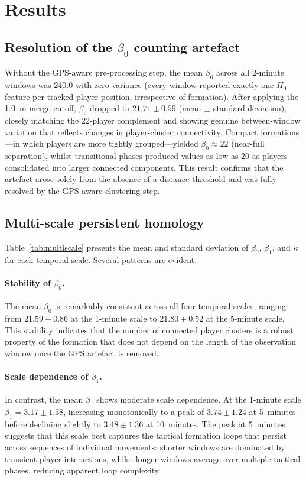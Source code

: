\documentclass[11pt,a4paper]{article}
\begin{document}
\section{Results}
\label{sec:results}

\subsection{Resolution of the \(\beta_0\) counting artefact}
\label{sec:artefact_results}

Without the GPS-aware pre-processing step, the mean
\(\beta_0\) across all 2-minute windows was 240.0 with
zero variance (every window reported exactly one
\(H_0\) feature per tracked player position, irrespective
of formation).  After applying the 1.0~m merge cutoff,
\(\beta_0\) dropped to \(21.71 \pm 0.59\) (mean
\(\pm\) standard deviation), closely matching the 22-player
complement and showing genuine between-window variation
that reflects changes in player-cluster connectivity.
Compact formations---in which players are more tightly
grouped---yielded \(\beta_0 \approx 22\) (near-full
separation), whilst transitional phases produced values as
low as 20 as players consolidated into larger connected
components.  This result confirms that the artefact arose
solely from the absence of a distance threshold and was
fully resolved by the GPS-aware clustering step.

\subsection{Multi-scale persistent homology}
\label{sec:multiscale}

Table~\ref{tab:multiscale} presents the mean and standard
deviation of \(\beta_0\), \(\beta_1\), and \(\kappa\) for
each temporal scale.  Several patterns are evident.

\paragraph{Stability of \(\beta_0\).}
The mean \(\beta_0\) is remarkably consistent across all
four temporal scales, ranging from \(21.59 \pm 0.86\) at
the 1-minute scale to \(21.80 \pm 0.52\) at the 5-minute
scale.  This stability indicates that the number of
connected player clusters is a robust property of the
formation that does not depend on the length of the
observation window once the GPS artefact is removed.

\paragraph{Scale dependence of \(\beta_1\).}
In contrast, the mean \(\beta_1\) shows moderate scale
dependence.  At the 1-minute scale \(\beta_1 = 3.17 \pm 1.38\),
increasing monotonically to a peak of \(3.74 \pm 1.24\) at
5~minutes before declining slightly to \(3.48 \pm 1.36\) at
10~minutes.  The peak at 5~minutes suggests that this scale
best captures the tactical formation loops that persist
across sequences of individual movements: shorter windows
are dominated by transient player interactions, whilst
longer windows average over multiple tactical phases,
reducing apparent loop complexity.
\end{document}
